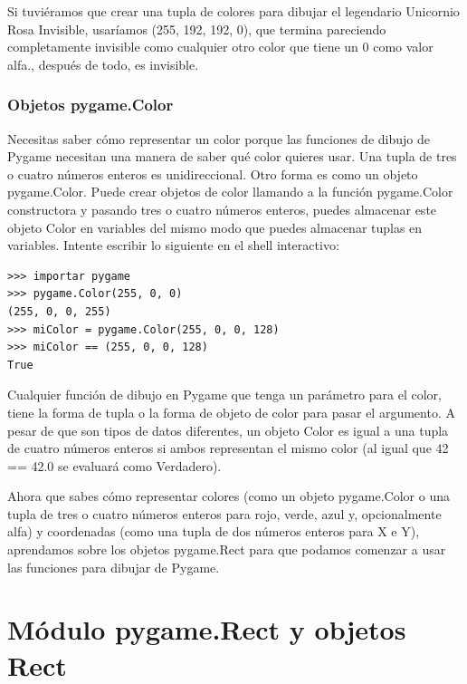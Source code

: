 Si tuviéramos que crear una tupla de colores para dibujar el legendario Unicornio Rosa Invisible, usaríamos
(255, 192, 192, 0), que termina pareciendo completamente invisible como cualquier otro color que tiene un 0 como valor {\ttfamily alfa}., después de todo, es invisible.




\subsubsection{Objetos pygame.Color}

Necesitas saber cómo representar un color porque las funciones de dibujo de Pygame necesitan una manera de saber qué color quieres usar. 
Una tupla de tres o cuatro números enteros es unidireccional. Otro forma es como un objeto {\ttfamily pygame.Color}. 
Puede crear objetos de color llamando a la  función {\ttfamily pygame.Color} constructora y pasando tres o cuatro números enteros, puedes almacenar este objeto Color en variables del mismo modo que puedes almacenar tuplas en variables. Intente escribir lo siguiente
en el shell interactivo:
\begin{lstlisting}		
>>> importar pygame
>>> pygame.Color(255, 0, 0)
(255, 0, 0, 255)
>>> miColor = pygame.Color(255, 0, 0, 128)
>>> miColor == (255, 0, 0, 128)
True
\end{lstlisting}


Cualquier función de dibujo en Pygame que tenga un parámetro para
el color, tiene la forma de tupla o la forma de objeto de color para pasar el argumento. A pesar de
que son tipos de datos diferentes, un objeto Color es igual a una tupla de cuatro números enteros si ambos
representan el mismo color (al igual que 42 == 42.0 se evaluará como Verdadero).

Ahora que sabes cómo representar colores (como un objeto {\ttfamily pygame.Color} o una tupla de tres o
cuatro números enteros para rojo, verde, azul y, opcionalmente {\ttfamily alfa}) y coordenadas (como una tupla de dos
 números enteros para X e Y), aprendamos sobre los objetos {\ttfamily pygame.Rect} para que podamos comenzar a usar 
 las funciones para  dibujar de Pygame.

\section{Módulo pygame.Rect y objetos Rect}\label{objeto_Rect}


